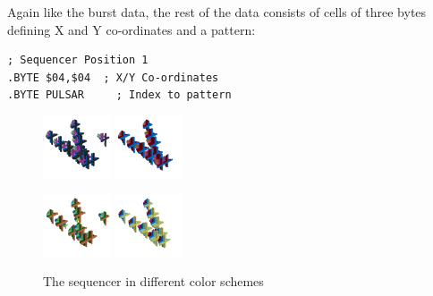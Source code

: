 Again like the burst data, the rest of the data consists of cells of three bytes defining X and Y co-ordinates
and a pattern:
\begin{lstlisting}
; Sequencer Position 1
.BYTE $04,$04  ; X/Y Co-ordinates
.BYTE PULSAR     ; Index to pattern    
\end{lstlisting}
\vfill
\begin{figure}[H]
    \centering
    \begin{adjustbox}{width=10cm,center}
      \includegraphics[width=2cm]{src/listing_commentary/sequencer/pattern1-0-45.png}%
      \includegraphics[width=2cm]{src/listing_commentary/sequencer/pattern1-1-45.png}%
    \end{adjustbox}
    \begin{adjustbox}{width=10cm,center}
      \includegraphics[width=2cm]{src/listing_commentary/sequencer/pattern1-3-45.png}%
      \includegraphics[width=2cm]{src/listing_commentary/sequencer/pattern1-4-45.png}%
    \end{adjustbox}
    \caption{The sequencer in different color schemes}
\end{figure}

